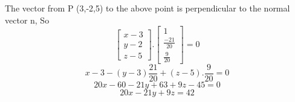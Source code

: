 The vector from P (3,-2,5) to the above point is perpendicular to the normal vector n,
So
\[
\begin{bmatrix}
    x - 3 \\ y -2 \\ z - 5
\end{bmatrix} . \begin{bmatrix}
1 \\ \frac{-21}{20} \\ \frac{9}{20}
\end{bmatrix} = 0 
\]
\[
x - 3 - (y-3)\frac{21}{20} +(z-5).\frac{9}{20}=0
\]
\[
20x - 60 - 21y + 63 + 9z - 45 = 0 
\]
\[
20x-21y+9z =42
\]